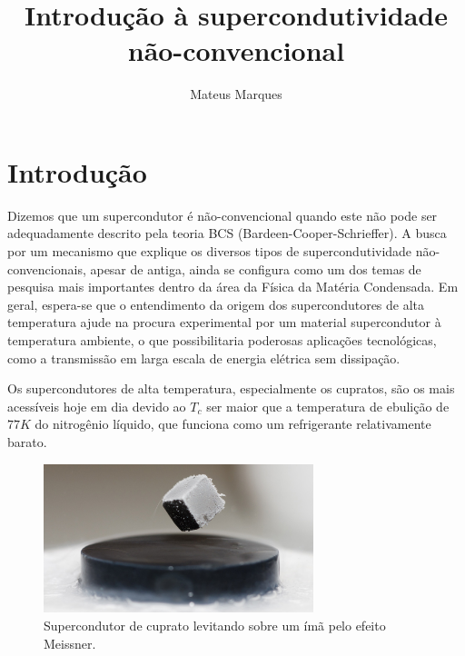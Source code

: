 \documentclass[a4paper,10pt]{article}
\title{\Huge{\textbf{Introdução à supercondutividade não-convencional}}}
\author{Mateus Marques}
\begin{document}
\maketitle

\section{Introdução}

Dizemos que um supercondutor é não-convencional quando este não pode ser adequadamente descrito pela teoria BCS (Bardeen-Cooper-Schrieffer). A busca por um mecanismo que explique os diversos tipos de supercondutividade não-convencionais, apesar de antiga, ainda se configura como um dos temas de pesquisa mais importantes dentro da área da Física da Matéria Condensada. Em geral, espera-se que o entendimento da origem dos supercondutores de alta temperatura ajude na procura experimental por um material supercondutor à temperatura ambiente, o que possibilitaria poderosas aplicações tecnológicas, como a transmissão em larga escala de energia elétrica sem dissipação.

Os supercondutores de alta temperatura, especialmente os cupratos, são os mais acessíveis hoje em dia devido ao $T_c$ ser maior que a temperatura de ebulição de $77 \unit{K}$ do nitrogênio líquido, que funciona como um refrigerante relativamente barato.

\begin{figure}[H]
\centering
\includegraphics[width=0.7\textwidth]{fig/levitating.jpg}
\caption{Supercondutor de cuprato levitando sobre um ímã pelo efeito Meissner.}
\label{fig:levitating}
\end{figure}

\end{document}
